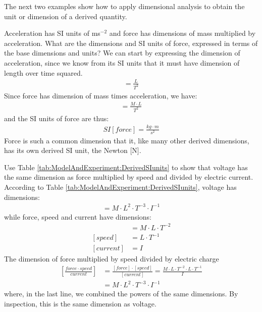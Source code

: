 The next two examples show how to apply dimensional analysis to obtain the unit or dimension of a derived quantity. 

\begin{example}{Acceleration has SI units of ms$^{-2}$ and force has dimensions of mass multiplied by acceleration. What are the dimensions and SI units of force, expressed in terms of the base dimensions and units?}
We can start by expressing the dimension of acceleration, since we know from its SI units that it must have dimension of length over time squared.
\begin{align*}
[acceleration] = \frac{L}{T^2}
\end{align*}
Since force has dimension of mass times acceleration, we have:
\begin{align*}
[force] = \frac{M\cdot L}{T^2}
\end{align*}
and the SI units of force are thus:
\begin{align*}
SI[force] = \frac{kg \cdot m}{s^2}
\end{align*}
Force is such a common dimension that it, like many other derived dimensions, has its own derived SI unit, the Newton [N].
\end{example}

\begin{example}{Use Table \ref{tab:ModelAndExperiment:DerivedSIunits} to show that voltage has the same dimension as force multiplied by speed and divided by electric current.}
According to Table \ref{tab:ModelAndExperiment:DerivedSIunits}, voltage has dimensions:
\begin{align*}
[voltage]=M\cdot L^2 \cdot T^{-3}\cdot I^{-1}
\end{align*}
while force, speed and current have dimensions:
\begin{align*}
[force]&=M\cdot L\cdot T^{-2} \\
[speed]&=L\cdot T^{-1}\\
[current]&=I
\end{align*}
The dimension of force multiplied by speed divided by electric charge
\begin{align*}
\left[\frac{force\cdot speed}{current}\right]&=\frac{[force]\cdot [speed]}{[current]}=\frac{M\cdot L\cdot T^{-2} \cdot L\cdot T^{-1} }{I}\\
&=M\cdot L^2 \cdot T^{-3}\cdot I^{-1}
\end{align*}
where, in the last line, we combined the powers of the same dimensions. By inspection, this is the same dimension as voltage.
\end{example}


